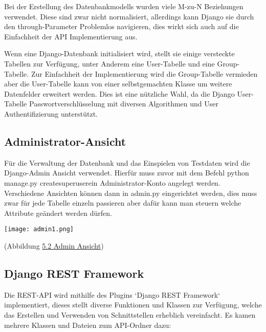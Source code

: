         \bigskip\noindent
        Bei der Erstellung des Datenbankmodells wurden viele M-zu-N Beziehungen verwendet. Diese sind zwar nicht normalisiert, allerdings kann Django sie durch den
        \flqq through\frqq-Parameter Problemlos navigieren, dies wirkt sich auch auf die Einfachheit der API Implementierung aus.

        \bigskip\noindent
        Wenn eine Django-Datenbank initialisiert wird, stellt sie einige versteckte Tabellen zur Verfügung, unter Anderem eine User-Tabelle und eine Group-Tabelle. Zur Einfachheit
        der Implementierung wird die Group-Tabelle vermieden aber die User-Tabelle kann von einer selbstgemachten Klasse um weitere Datenfelder erweitert werden. Dies ist eine
        nützliche Wahl, da die Django User-Tabelle Passwortverschlüsselung mit diversen Algorithmen und User Authentifizierung unterstützt.
    
    \subsection{Administrator-Ansicht}
        Für die Verwaltung der Datenbank und das Einspielen von Testdaten wird die Django-Admin Ansicht verwendet. Hierfür muss zuvor mit dem Befehl
        \flqq python manage.py createsuperuser\frqq ein Administrator-Konto angelegt werden. Verschiedene Ansichten können dann in admin.py eingerichtet werden,
        dies muss zwar für jede Tabelle einzeln passieren aber dafür kann man steuern welche Attribute geändert werden dürfen.

        \bigskip\noindent
        \begin{center}
            \texttt{[image: admin1.png]}
        \end{center}
        \begin{center}
            (Abbildung \hyperref[admin]{5.2 Admin Ansicht})
        \end{center}

    \subsection{Django REST Framework}
        Die REST-API wird mithilfe des Plugins `Django REST Framework` implementiert, dieses stellt diverse Funktionen und Klassen zur Verfügung, welche
        das Erstellen und Verwenden von Schnittstellen erheblich vereinfacht. Es kamen mehrere Klassen und Dateien zum API-Ordner dazu:
            
